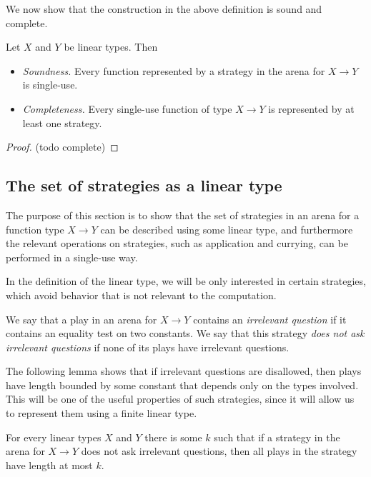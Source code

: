 We now show that the construction in the above definition is sound and complete.

\begin{lemma}
    Let $X$ and $Y$ be linear types. Then 
    \begin{itemize}
        \item \emph{Soundness.} Every function represented by a strategy in the arena for $X \to Y$ is single-use.
        \item \emph{Completeness.} Every single-use function of type $X \to Y$ is represented by at least one strategy.
    \end{itemize}
\end{lemma}
\begin{proof}
    (todo complete)
\end{proof}

\subsection{The set of strategies as a linear type}
The purpose of this section is to show that the set of strategies in an arena for a function type $X \to Y$ can be described using some linear type, and furthermore the relevant operations on strategies, such as application and currying, can be performed in a single-use way. 

In the definition of the linear type, we will be only interested in certain strategies, which avoid behavior that is not relevant to the computation.

\begin{definition} We say that a play in an arena for $X \to Y$ contains an \emph{irrelevant question} if it contains an equality test on two constants. We say that this strategy \emph{does not ask irrelevant questions} if none of its plays have irrelevant questions.
\end{definition}
  
The following lemma shows that if irrelevant questions are disallowed, then plays have length bounded by some constant that depends only on the types involved. This will be one of the useful properties of such strategies, since it will allow us to represent them using a finite linear type.

\begin{lemma}\label{lem:no-irrelevant-questions-are-bounded}
    For every linear types $X$ and $Y$ there is some $k$ such that if a strategy in the arena for $X \to Y$ does not ask irrelevant questions, then all plays in the strategy have length at most $k$.
\end{lemma}

